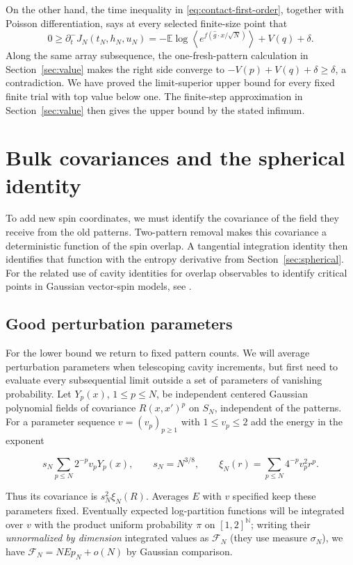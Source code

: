 \documentclass[11pt]{article}
\newcommand{\E}{\mathbb E}
\begin{document}
On the other hand, the time inequality in \eqref{eq:contact-first-order}, together with Poisson differentiation, says at every selected finite-size point that
\[
 0\ge\partial_t^-J_N(t_N,h_N,u_N)
   =-\E\log\left\langle e^{f(\widehat g\cdot x/\sqrt N)}\right\rangle
       +V(q)+\delta.
\]
Along the same array subsequence, the one-fresh-pattern calculation in Section~\ref{sec:value} makes the right side converge to
$-V(p)+V(q)+\delta\ge\delta$, a contradiction. We have proved the limit-superior upper bound for every fixed finite trial with top value below one. The finite-step approximation in Section~\ref{sec:value} then gives the upper bound by the stated infimum.

\section{Bulk covariances and the spherical identity}\label{sec:bulk}

To add new spin coordinates, we must identify the covariance of the field they receive from the old patterns. Two-pattern removal makes this covariance a deterministic function of the spin overlap. A tangential integration identity then identifies that function with the entropy derivative from Section~\ref{sec:spherical}.
For the related use of cavity identities for overlap observables to identify
critical points in Gaussian vector-spin models, see
\cite[Sections~6--7]{ChenMourrat2025Critical}.

\subsection{Good perturbation parameters}

For the lower bound we return to fixed pattern counts. We will average perturbation parameters when telescoping cavity increments, but first need to evaluate every subsequential limit outside a set of parameters of vanishing probability. Let $Y_p(x)$, $1\le p\le N$, be independent centered Gaussian polynomial fields of covariance $R(x,x')^p$ on $S_N$, independent of the patterns. For a parameter sequence $v=(v_p)_{p\ge1}$ with $1\le v_p\le2$ add the energy in the exponent

\begin{equation}\label{eq:bulk-perturbation}
s_N \sum_{p\le N}2^{-p}v_p Y_p(x),\qquad s_N=N^{3/8},
 \qquad \xi_N(r)=\sum_{p\le N}4^{-p}v_p^2 r^p.
\end{equation}

Thus its covariance is $s_N^2\xi_N(R)$. Averages $E$ with $v$ specified keep these parameters fixed. Eventually expected log-partition functions will be integrated over $v$ with the product uniform probability $\pi$ on $[1,2]^{\mathbb N}$; writing their \emph{unnormalized by dimension} integrated values as $\mathcal F_N$ (they use measure $\sigma_N$), we have $\mathcal F_N=N E p_N+o(N)$ by Gaussian comparison.
\end{document}
